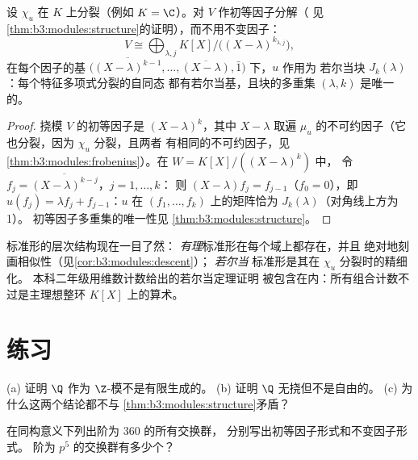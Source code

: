\begin{theorem}\label{thm:b3:modules:jordan}
设 $\chi_u$ 在 $K$ 上分裂（例如 $K = \C$）。对
$V$ 作初等因子分解（
见\cref{thm:b3:modules:structure}的证明），而不用不变因子：
\[
V \cong \bigoplus_{\lambda, j} K[X]\big/\bigl((X -
\lambda)^{k_{\lambda,j}}\bigr),
\]
在每个因子的基 $\bigl(\overline{(X-\lambda)^{k-1}}, \dots,
\overline{(X - \lambda)}, \bar 1\bigr)$ 下，$u$ 作用为
若尔当块 $J_k(\lambda)$：每个特征多项式分裂的自同态
都有若尔当基，且块的多重集
$(\lambda, k)$ 是唯一的。
\end{theorem}

\begin{proof}
挠模 $V$ 的初等因子是
$(X - \lambda)^k$，其中 $X - \lambda$ 取遍
$\mu_u$ 的不可约因子（它也分裂，因为 $\chi_u$ 分裂，且两者
有相同的不可约因子，见
\cref{thm:b3:modules:frobenius}）。在 $W = K[X]/((X-\lambda)^k)$ 中，
令 $f_j = \overline{(X - \lambda)^{k-j}}$，$j = 1, \dots, k$：
则 $(X - \lambda)f_j = f_{j-1}$（$f_0 = 0$），即 $u(f_j)
= \lambda f_j + f_{j-1}$：$u$ 在 $(f_1, \dots,
f_k)$ 上的矩阵恰为 $J_k(\lambda)$（对角线上方为 1）。
初等因子多重集的唯一性见
\cref{thm:b3:modules:structure}。
\end{proof}

\begin{remark}\label{rem:b3:modules:overview}
标准形的层次结构现在一目了然：
\emph{有理}标准形在每个域上都存在，并且
绝对地刻画相似性（见\cref{cor:b3:modules:descent}）；
\emph{若尔当} 标准形是其在 $\chi_u$ 分裂时的精细化。
本科二年级用维数计数给出的若尔当定理证明
被包含在内：所有组合计数不过是主理想整环
$K[X]$ 上的算术。
\end{remark}

\section{练习}

\begin{exercise}[$\star$]\label{exo:b3:modules:1}
(a) 证明 $\Q$ 作为 $\Z$-模不是有限生成的。
(b) 证明 $\Q$ 无挠但不是自由的。
(c) 为什么这两个结论都不与
\cref{thm:b3:modules:structure}矛盾？
\end{exercise}

\begin{exercise}[$\star$]\label{exo:b3:modules:2}
在同构意义下列出阶为 $360$ 的所有交换群，
分别写出初等因子形式和不变因子形式。
阶为 $p^5$ 的交换群有多少个？
\end{exercise}

